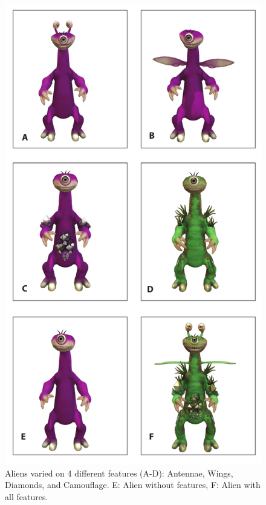 \documentclass[10pt,letterpaper]{article}
\begin{document}
\begin{figure}[htb!]
\centering
\includegraphics[scale=0.3]{aliens.png}
\caption{Aliens varied on 4 different features (A-D): Antennae, Wings, Diamonds, and Camouflage. E: Alien without features, F: Alien with all features.}
\label{Alien_features}
\end{figure}
\end{document}
